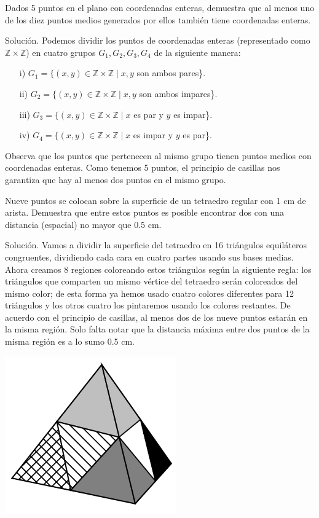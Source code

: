 \documentclass[11pt]{scrartcl}
\begin{document}
\begin{example}
Dados 5 puntos en el plano con coordenadas enteras, demuestra que al menos uno de los diez puntos medios generados por ellos también tiene coordenadas enteras.    
\end{example}
Solución. Podemos dividir los puntos de coordenadas enteras (representado como \(\mathbb{Z} \times \mathbb{Z}\)) en cuatro grupos \(G_1, G_2, G_3, G_4\) de la siguiente manera:\begin{itemize}
\item[i)] \(G_1 = \{(x, y) \in \mathbb{Z} \times \mathbb{Z} \mid x, y\) son ambos pares\}.
\item[ii)] \(G_2 = \{(x, y) \in \mathbb{Z} \times \mathbb{Z} \mid x, y\) son ambos impares\}.
\item[iii)] \(G_3 = \{(x, y) \in \mathbb{Z} \times \mathbb{Z} \mid x\) es par y \(y\) es impar\}.
\item[iv)] \(G_4 = \{(x, y) \in \mathbb{Z} \times \mathbb{Z} \mid x\) es impar y \(y\) es par\}.
\end{itemize}
Observa que los puntos que pertenecen al mismo grupo tienen puntos medios con coordenadas enteras. Como tenemos 5 puntos, el principio de casillas nos garantiza que hay al menos dos puntos en el mismo grupo.

\begin{example}
Nueve puntos se colocan sobre la superficie de un tetraedro regular con 1 cm de arista. Demuestra que entre estos puntos es posible encontrar dos con una distancia (espacial) no mayor que 0.5 cm.
\end{example}
Solución. Vamos a dividir la superficie del tetraedro en 16 triángulos equiláteros congruentes, dividiendo cada cara en cuatro partes usando sus bases medias. Ahora creamos 8 regiones coloreando estos triángulos según la siguiente regla: los triángulos que comparten un mismo vértice del tetraedro serán coloreados del mismo color; de esta forma ya hemos usado cuatro colores diferentes para 12 triángulos y los otros cuatro los pintaremos usando los colores restantes. De acuerdo con el principio de casillas, al menos dos de los nueve puntos estarán en la misma región. Solo falta notar que la distancia máxima entre dos puntos de la misma región es a lo sumo 0.5 cm.
\begin{center}
    \includegraphics[scale=1]{images/clase_07_tetraedro.png}
\end{center}
\end{document}
